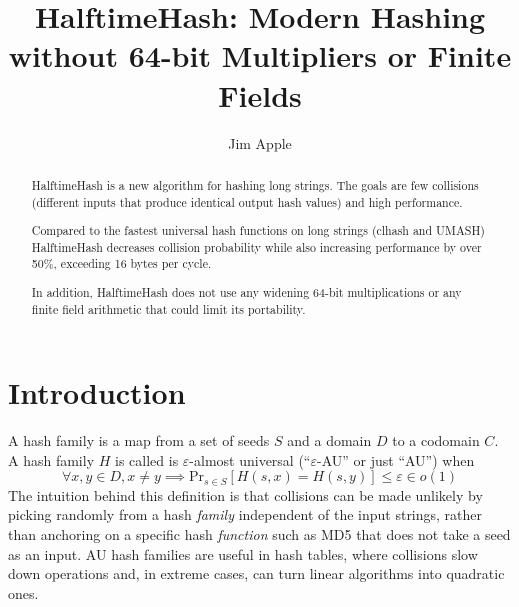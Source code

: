 \documentclass{llncs}
\begin{document}
\title{HalftimeHash: Modern Hashing without 64-bit Multipliers or Finite Fields}
\author{Jim Apple
}
\maketitle

\begin{abstract}
HalftimeHash is a new algorithm for hashing long strings.
The goals are few collisions (different inputs that produce identical output hash values) and high performance.

Compared to the fastest universal hash functions on long strings (clhash and UMASH) HalftimeHash decreases collision probability while also increasing performance by over 50\%, exceeding 16 bytes per cycle.

In addition, HalftimeHash does not use any widening 64-bit multiplications or any finite field arithmetic that could limit its portability.

\end{abstract}

\section{Introduction}
A hash family is a map from a set of seeds $S$ and a domain $D$ to a codomain $C$.
A hash family $H$ is called is $\varepsilon$-almost universal (``$\varepsilon$-AU'' or just ``AU'') when
\[
\forall x,y \in D, x \neq y \implies \mathrm{Pr}_{s \in S}[H(s, x) = H(s, y)] \leq \varepsilon \in o(1)
\]
The intuition behind this definition is that collisions can be made unlikely by picking randomly from a hash {\em family} independent of the input strings, rather than anchoring on a specific hash {\em function} such as MD5 that does not take a seed as an input. AU hash families are useful in hash tables, where collisions slow down operations and, in extreme cases, can turn linear algorithms into quadratic ones. \cite{tabulation,rust-quadratic,impala-quadratic,algorithm-attack}
\end{document}
